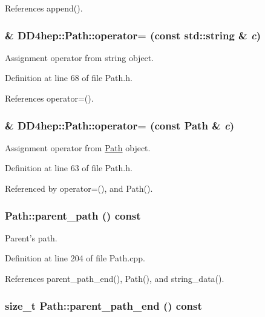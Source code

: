 References append().\hypertarget{class_d_d4hep_1_1_path_aa1a61f3b3eab565724525f423fe465e6}{
\subsubsection[{operator=}]{\& DD4hep::Path::operator= (const std::string \& {\em c})}}
\label{class_d_d4hep_1_1_path_aa1a61f3b3eab565724525f423fe465e6}


Assignment operator from string object. 

Definition at line 68 of file Path.h.

References operator=().\hypertarget{class_d_d4hep_1_1_path_a9d22ed81a818b6d7e982af1c4ea01dc4}{
\subsubsection[{operator=}]{\& DD4hep::Path::operator= (const {\bf Path} \& {\em c})}}
\label{class_d_d4hep_1_1_path_a9d22ed81a818b6d7e982af1c4ea01dc4}


Assignment operator from \hyperlink{class_d_d4hep_1_1_path}{Path} object. 

Definition at line 63 of file Path.h.

Referenced by operator=(), and Path().\hypertarget{class_d_d4hep_1_1_path_a0d758ba490f36635b39a7e2e8c6102b2}{
\subsubsection[{parent\_\-path}]{ Path::parent\_\-path () const}}
\label{class_d_d4hep_1_1_path_a0d758ba490f36635b39a7e2e8c6102b2}


Parent's path. 

Definition at line 204 of file Path.cpp.

References parent\_\-path\_\-end(), Path(), and string\_\-data().\hypertarget{class_d_d4hep_1_1_path_a5f107fe34944be1f0ee85b0e886232b7}{
\subsubsection[{parent\_\-path\_\-end}]{\setlength{\rightskip}{0pt plus 5cm}size\_\-t Path::parent\_\-path\_\-end () const}}
\label{class_d_d4hep_1_1_path_a5f107fe34944be1f0ee85b0e886232b7}


